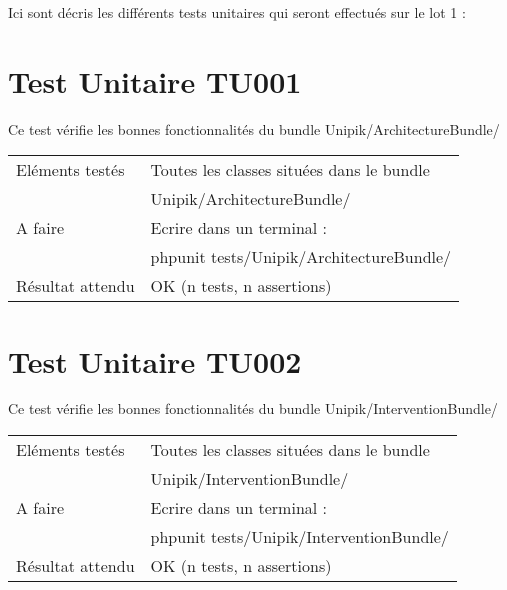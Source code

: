 
Ici sont décris les différents tests unitaires qui seront effectués sur le lot 1 :

\section{Test Unitaire TU001}
	
	Ce test vérifie les bonnes fonctionnalités du bundle Unipik/ArchitectureBundle/ \\
				
  	\begin{center}
  		\begin{tabular}[h]{|p{}|p{}|}
		\hline
			Eléments testés & Toutes les classes situées dans le bundle \\ 																& Unipik/ArchitectureBundle/ \\\hline
    			A faire & Ecrire dans un terminal : \\ 
    					& phpunit tests/Unipik/ArchitectureBundle/\\\hline
    			Résultat attendu & OK (n tests, n assertions) \\\hline
     	\end{tabular}
  	\end{center}	
  		
\section{Test Unitaire TU002}
	
	Ce test vérifie les bonnes fonctionnalités du bundle Unipik/InterventionBundle/ \\
				
  	\begin{center}
  		\begin{tabular}[h]{|p{}|p{}|}
		\hline
			Eléments testés & Toutes les classes situées dans le bundle \\ 																& Unipik/InterventionBundle/ \\\hline
    			A faire & Ecrire dans un terminal : \\ 
    					& phpunit tests/Unipik/InterventionBundle/\\\hline
    			Résultat attendu & OK (n tests, n assertions) \\\hline
     	\end{tabular}
  	\end{center}	
  		
